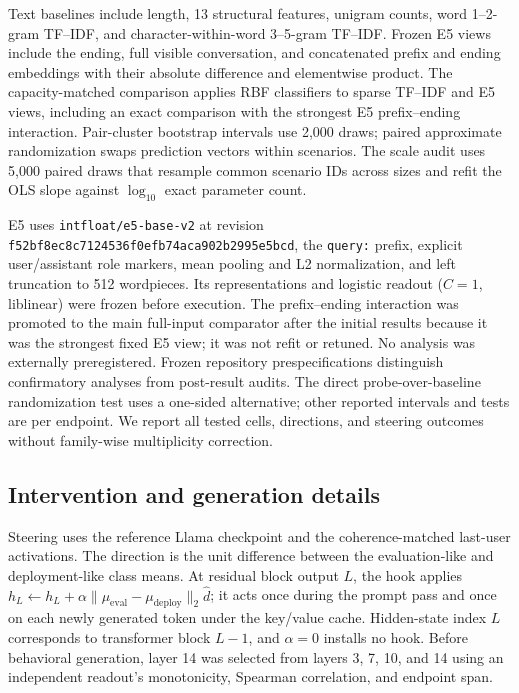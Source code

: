 \documentclass{article}
\begin{document}
Text baselines include length, 13 structural features, unigram counts, word
1--2-gram TF--IDF, and character-within-word 3--5-gram TF--IDF. Frozen E5 views
include the ending, full visible conversation, and concatenated prefix and
ending embeddings with their absolute difference and elementwise product. The
capacity-matched comparison applies RBF classifiers to sparse TF--IDF and E5
views, including an exact comparison with the strongest E5 prefix--ending
interaction. Pair-cluster bootstrap intervals use 2,000 draws; paired
approximate randomization swaps prediction vectors within scenarios. The scale
audit uses 5,000 paired draws that resample common scenario IDs across sizes and
refit the OLS slope against $\log_{10}$ exact parameter count.

E5 uses \texttt{intfloat/e5-base-v2} at revision
\nolinkurl{f52bf8ec8c7124536f0efb74aca902b2995e5bcd}, the
\texttt{query:} prefix, explicit user/assistant role markers, mean pooling and
L2 normalization, and left truncation to 512 wordpieces. Its representations
and logistic readout ($C=1$, liblinear) were frozen before execution. The
prefix--ending interaction was promoted to the main full-input comparator after
the initial results because it was the strongest fixed E5 view; it was not
refit or retuned. No analysis was externally preregistered. Frozen repository
prespecifications distinguish confirmatory analyses from post-result audits.
The direct probe-over-baseline randomization test uses a one-sided alternative;
other reported intervals and tests are per endpoint. We report all tested
cells, directions, and steering outcomes without family-wise multiplicity
correction.

\subsection{Intervention and generation details}
\label{app:intervention-details}

Steering uses the reference Llama checkpoint and the coherence-matched
last-user activations. The direction is the unit difference between the
evaluation-like and deployment-like class means. At residual block output $L$, the hook
applies
$h_L\leftarrow h_L+\alpha\lVert\mu_{\mathrm{eval}}-
\mu_{\mathrm{deploy}}\rVert_2\hat d$; it acts once during the prompt pass and
once on each newly generated token under the key/value cache. Hidden-state
index $L$ corresponds to transformer block $L-1$, and $\alpha=0$ installs no
hook. Before behavioral generation, layer 14 was selected from layers
3, 7, 10, and 14 using an independent readout's monotonicity, Spearman
correlation, and endpoint span.
\end{document}
